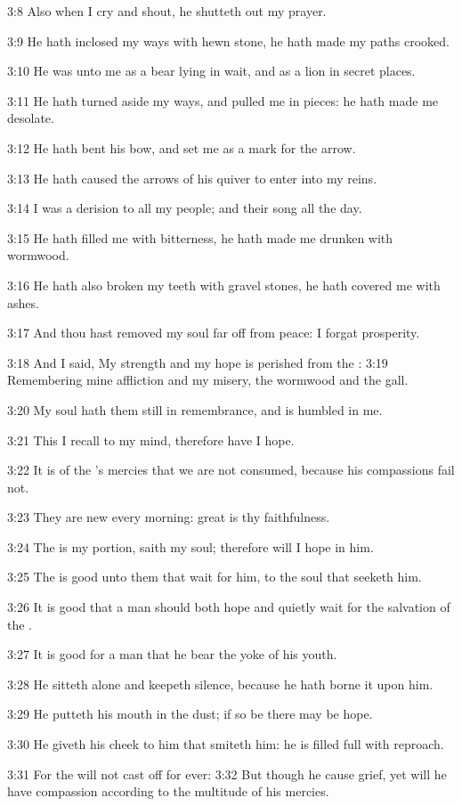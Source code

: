 3:8 Also when I cry and shout, he shutteth out my prayer.

3:9 He hath inclosed my ways with hewn stone, he hath made my paths
crooked.

3:10 He was unto me as a bear lying in wait, and as a lion in secret
places.

3:11 He hath turned aside my ways, and pulled me in pieces: he hath
made me desolate.

3:12 He hath bent his bow, and set me as a mark for the arrow.

3:13 He hath caused the arrows of his quiver to enter into my reins.

3:14 I was a derision to all my people; and their song all the day.

3:15 He hath filled me with bitterness, he hath made me drunken with
wormwood.

3:16 He hath also broken my teeth with gravel stones, he hath covered
me with ashes.

3:17 And thou hast removed my soul far off from peace: I forgat
prosperity.

3:18 And I said, My strength and my hope is perished from the \LORD:
3:19 Remembering mine affliction and my misery, the wormwood and the
gall.

3:20 My soul hath them still in remembrance, and is humbled in me.

3:21 This I recall to my mind, therefore have I hope.

3:22 It is of the \LORD's mercies that we are not consumed, because his
compassions fail not.

3:23 They are new every morning: great is thy faithfulness.

3:24 The \LORD is my portion, saith my soul; therefore will I hope in
him.

3:25 The \LORD is good unto them that wait for him, to the soul that
seeketh him.

3:26 It is good that a man should both hope and quietly wait for the
salvation of the \LORD.

3:27 It is good for a man that he bear the yoke of his youth.

3:28 He sitteth alone and keepeth silence, because he hath borne it
upon him.

3:29 He putteth his mouth in the dust; if so be there may be hope.

3:30 He giveth his cheek to him that smiteth him: he is filled full
with reproach.

3:31 For the \LORD will not cast off for ever: 3:32 But though he cause
grief, yet will he have compassion according to the multitude of his
mercies.

